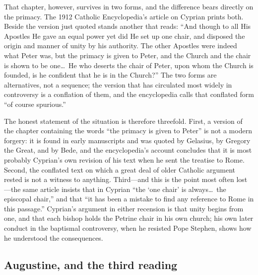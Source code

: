 That chapter, however, survives in two forms, and the difference bears
directly on the primacy. The 1912 Catholic Encyclopedia's article on Cyprian
prints both. Beside the version just quoted stands another that reads: ``And
though to all His Apostles He gave an equal power yet did He set up one
chair, and disposed the origin and manner of unity by his authority. The
other Apostles were indeed what Peter was, but the primacy is given to Peter,
and the Church and the chair is shown to be one\ldots\ He who deserts the
chair of Peter, upon whom the Church is founded, is he confident that he is
in the Church?'' The two forms are alternatives, not a sequence; the version
that has circulated most widely in controversy is a conflation of them, and
the encyclopedia calls that conflated form ``of course spurious.''

The honest statement of the situation is therefore threefold. First, a
version of the chapter containing the words ``the primacy is given to
Peter'' is not a modern forgery: it is found in early manuscripts and was
quoted by Gelasius, by Gregory the Great, and by Bede, and the encyclopedia's account concludes that it is most
probably Cyprian's own revision of his text when he sent the treatise to
Rome. Second, the conflated text on which a great deal of older Catholic
argument rested is not a witness to anything. Third---and this is the point
most often lost---the same article insists that in Cyprian ``the `one chair'
is always\ldots\ the episcopal chair,'' and that ``it has been a mistake to
find any reference to Rome in this passage.'' Cyprian's argument in either
recension is that unity begins from one, and that each bishop holds the
Petrine chair in his own church; his own later conduct in the baptismal
controversy, when he resisted Pope Stephen, shows how he understood the
consequences.


\subsection{Augustine, and the third reading}

